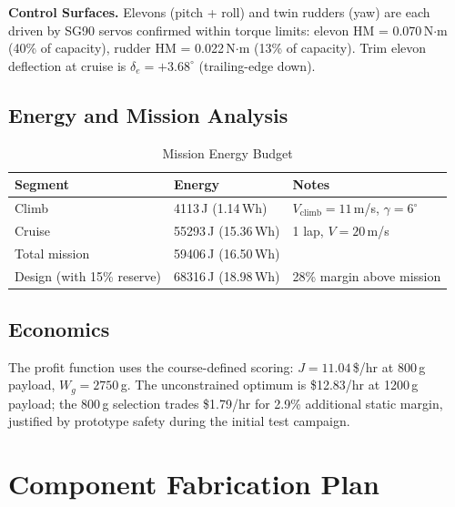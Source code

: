 \documentclass[10pt]{article}
\begin{document}
\textbf{Control Surfaces.}
Elevons (pitch + roll) and twin rudders (yaw) are each driven by SG90 servos
confirmed within torque limits:
elevon HM = 0.070\,N$\cdot$m (40\% of capacity),
rudder HM = 0.022\,N$\cdot$m (13\% of capacity).
Trim elevon deflection at cruise is $\delta_e = +3.68^\circ$ (trailing-edge down).

\subsection{Energy and Mission Analysis}

\begin{table}[H]
\centering
\caption{Mission Energy Budget}
\small
\begin{tabular}{lll}
\toprule
Segment & Energy & Notes \\
\midrule
Climb & 4113\,J (1.14\,Wh) & $V_{\text{climb}} = 11$\,m/s, $\gamma = 6^\circ$ \\
Cruise & 55293\,J (15.36\,Wh) & 1 lap, $V = 20$\,m/s \\
Total mission & 59406\,J (16.50\,Wh) & \\
Design (with 15\% reserve) & 68316\,J (18.98\,Wh) & 28\% margin above mission \\
\bottomrule
\end{tabular}
\end{table}

\subsection{Economics}

The profit function uses the course-defined scoring:
$J = 11.04$\,\$/hr at 800\,g payload, $W_g = 2750$\,g.
The unconstrained optimum is \$12.83/hr at 1200\,g payload; the 800\,g selection
trades \$1.79/hr for 2.9\% additional static margin, justified by prototype safety
during the initial test campaign.

\section{Component Fabrication Plan}
\end{document}
